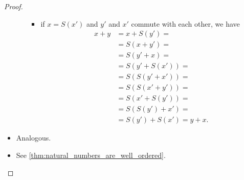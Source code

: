 \begin{proof}
\begin{itemize}
\begin{itemize}
\begin{itemize}
        \item if \( x = S(x') \) and \( y' \) and \( x' \) commute with each other, we have
        \begin{align*}
          x + y
          &=
          x + S(y')
          = \\ &=
          S(x + y')
          = \\ &=
          S(y' + x)
          = \\ &=
          S(y' + S(x'))
          = \\ &=
          S(S(y' + x'))
          = \\ &=
          S(S(x' + y'))
          = \\ &=
          S(x' + S(y'))
          = \\ &=
          S(S(y') + x')
          = \\ &=
          S(y') + S(x')
          =
          y + x.
        \end{align*}
      \end{itemize}
    \end{itemize}

    \item Analogous.

    \item See \cref{thm:natural_numbers_are_well_ordered}.
  \end{itemize}
\end{proof}

